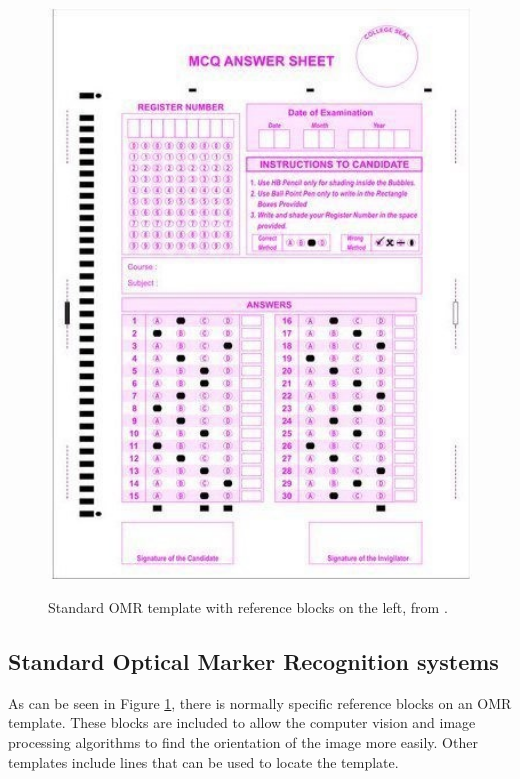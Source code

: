 \begin{figure}
  \centering
  \includegraphics[width=14cm]{omrTemplate}\\
  \caption{Standard OMR template with reference blocks on the left, from \citet{stdTemplate}.}
  \label{fig:omrTemplate}
\end{figure}

\subsection{Standard Optical Marker Recognition systems}
\label{sec:StandardTech}

As can be seen in Figure \ref{fig:omrTemplate}, there is normally specific reference blocks on an OMR template. These blocks are included to allow the computer vision and image processing algorithms to find the orientation of the image more easily. Other templates include lines that can be used to locate the template.

